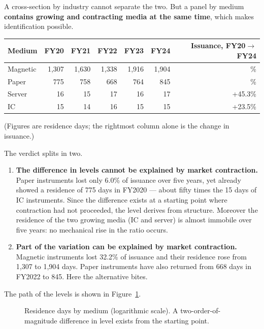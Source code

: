 A cross-section by industry cannot separate the two. But a panel by medium
\textbf{contains growing and contracting media at the same time}, which makes identification
possible.

\begin{center}
\begin{tabular}{@{}lrrrrrr@{}}
\toprule
Medium & FY20 & FY21 & FY22 & FY23 & FY24 & Issuance, FY20$\to$FY24 \\
\midrule
Magnetic & 1,307 & 1,630 & 1,338 & 1,916 & 1,904 & \textminus 32.2\% \\
Paper & 775 & 758 & 668 & 764 & 845 & \textminus 6.0\% \\
Server & 16 & 15 & 17 & 16 & 17 & +45.3\% \\
IC & 15 & 14 & 16 & 15 & 15 & +23.5\% \\
\bottomrule
\end{tabular}
\label{tab:family2-media-panel}
\end{center}
\begin{center}
\footnotesize (Figures are residence days; the rightmost column alone is the change in issuance.)
\end{center}

The verdict splits in two.

\begin{enumerate}[label=(\arabic*)]
\item \textbf{The difference in levels cannot be explained by market contraction.}
Paper instruments lost only 6.0\% of issuance over five years, yet already showed a residence of
775 days in FY2020 — about fifty times the 15 days of IC instruments. Since the difference exists
at a starting point where contraction had not proceeded, the level derives from structure.
Moreover the residence of the two growing media (IC and server) is almost immobile over five
years: no mechanical rise in the ratio occurs.

\item \textbf{Part of the variation can be explained by market contraction.}
Magnetic instruments lost 32.2\% of issuance and their residence rose from 1,307 to 1,904 days.
Paper instruments have also returned from 668 days in FY2022 to 845. Here the alternative bites.
\end{enumerate}

The path of the levels is shown in Figure~\ref{fig:media-panel}.

\begin{figure}[htbp]
\centering
{}
\caption{Residence days by medium (logarithmic scale). A two-order-of-magnitude difference in level exists from the starting point.}
\label{fig:media-panel}
\end{figure}

